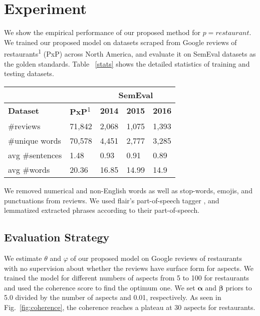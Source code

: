 \documentclass[11pt]{article}
\begin{document}
\section{Experiment}
We show the empirical performance of our proposed method for $p=restaurant$. We trained our proposed model on datasets scraped from Google reviews of restaurants\textsuperscript{1} (PxP) across North America, and evaluate it on SemEval datasets \cite{Pontiki_2014,Pontiki_2015,Pontiki_2016} as the golden standards. Table ~\ref{stats} shows the detailed statistics of training and testing datasets.

\begin{table}[]
\begin{tabular}{lllll}
\cline{3-5}
                    &              & \multicolumn{3}{c}{\textbf{SemEval}}          \\ \hline
\textbf{Dataset}    & \textbf{PxP}\textsuperscript{1} & \textbf{2014} & \textbf{2015} & \textbf{2016} \\ \hline
{\#reviews}       & 71,842       & 2,068         & 1,075         & 1,393         \\
{\#unique words}  & 70,578       & 4,451         & 2,777         & 3,285         \\
{avg \#sentences} & 1.48         & 0.93          & 0.91          & 0.89          \\
{avg \#words}     & 20.36        & 16.85         & 14.99         & 14.9          \\ \hline
\end{tabular}
\end{table}
We removed numerical and non-English words as well as stop-words, emojis, and punctuations from reviews. We used flair's part-of-speech tagger \cite{flair_2019}, and lemmatized extracted phrases according to their part-of-speech.

\subsection{Evaluation Strategy}
We estimate ${\theta}$ and ${\varphi}$ of our proposed model on Google reviews of restaurants with no supervision about whether the reviews have surface form for aspects. We trained the model for different numbers of aspects from 5 to 100 for restaurants and used the coherence score \cite{Mimno_2011} to find the optimum one. We set ${\bm{\alpha}}$ and ${\bm{\beta}}$ priors to 5.0 divided by the number of aspects and 0.01, respectively. As seen in Fig.~\ref{fig:coherence}, the coherence reaches a plateau at 30 aspects for restaurants.
\end{document}
